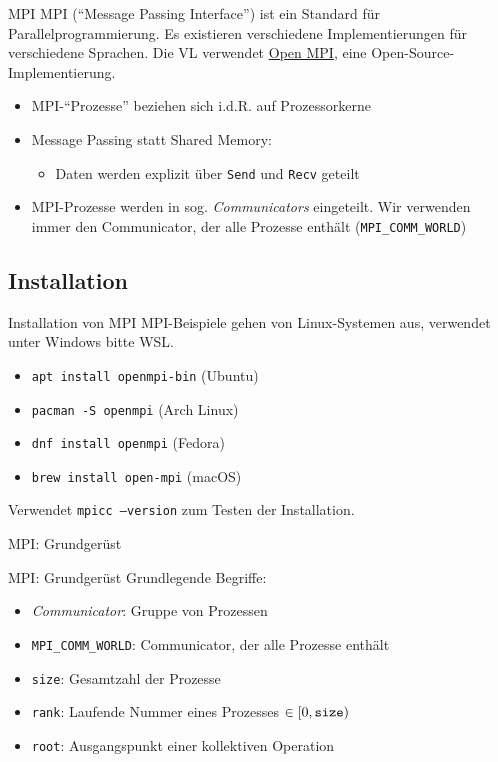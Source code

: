 \documentclass{beamer}
\begin{document}
\begin{frame}{MPI}
	MPI (\enquote{Message Passing Interface}) ist ein Standard für Parallelprogrammierung.
	Es existieren verschiedene Implementierungen für verschiedene Sprachen.
	Die VL verwendet \href{https://www.open-mpi.org/}{Open MPI}, eine Open-Source-Implementierung.

	\begin{itemize}
		\item MPI-\enquote{Prozesse} beziehen sich i.d.R. auf Prozessorkerne
		\item Message Passing statt Shared Memory:
		\begin{itemize}
			\item Daten werden explizit über \texttt{Send} und \texttt{Recv} geteilt
		\end{itemize}
		\item MPI-Prozesse werden in sog. \emph{Communicators} eingeteilt. Wir verwenden immer den Communicator, der alle Prozesse enthält (\texttt{MPI\_COMM\_WORLD})
	\end{itemize}
\end{frame}

\subsection{Installation}

\begin{frame}{Installation von MPI}
	MPI-Beispiele gehen von Linux-Systemen aus, verwendet unter Windows bitte WSL.

	\begin{itemize}
		\item \texttt{apt install openmpi-bin} (Ubuntu)
		\item \texttt{pacman -S openmpi} (Arch Linux)
		\item \texttt{dnf install openmpi} (Fedora)
                \item \texttt{brew install open-mpi} (macOS)
	\end{itemize}

	Verwendet \texttt{mpicc --version} zum Testen der Installation.
\end{frame}

\begin{frame}{MPI: Grundgerüst}
\end{frame}

\begin{frame}{MPI: Grundgerüst}
  Grundlegende Begriffe:

  \begin{itemize}
    \item \emph{Communicator}: Gruppe von Prozessen
    \item \texttt{MPI\_COMM\_WORLD}: Communicator, der alle Prozesse enthält
    \item \texttt{size}: Gesamtzahl der Prozesse
    \item \texttt{rank}: Laufende Nummer eines Prozesses $\in [0, \text{\texttt{size}})$
    \item \texttt{root}: Ausgangspunkt einer kollektiven Operation
  \end{itemize}
\end{frame}
\end{document}
